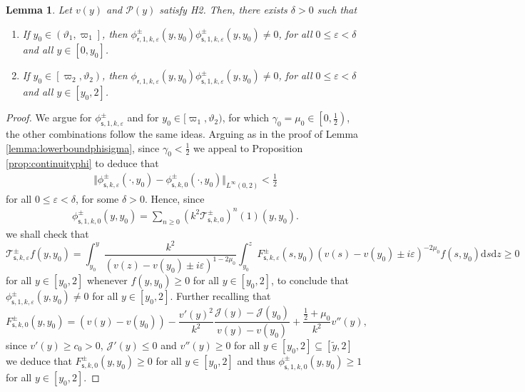 \documentclass[11pt,reqno]{amsproc}
\newtheorem{lemma}[proposition]{Lemma}
\theoremstyle{definition}
\numberwithin{equation}{section}
\newcommand{\cJ}{{\mathcal{J}}}
\newcommand{\sr}{{\mathsf{r}}}
\newcommand{\s}{{\mathsf{s}}}
\newcommand{\cT}{{\mathcal T}}
\renewcommand{\d}{\mathrm{d}}
\newcommand{\ep}{\varepsilon}
\renewcommand{\P}{{\mathcal{P}}}
\begin{document}
\begin{lemma}\label{lemma:nonzerophisrphis}
Let $v(y)$ and $\P(y)$ satisfy H2. Then, there exists $\delta>0$ such that
\begin{enumerate}
\item If $y_0\in \left( \vartheta_1, \varpi_1 \right]$, then $\phi_{\sr,1,k,\ep}^\pm(y,y_0)\phi_{\s,1,k,\ep}^\pm(y,y_0)\neq 0$, for all $0 \leq \ep < \delta$ and all $y\in [0,y_0]$.
\item If $y_0 \in \left[ \varpi_2, \vartheta_2 \right)$, then $\phi_{\sr,1,k,\ep}(y,y_0)\phi_{\s,1,k,\ep}^\pm(y,y_0)\neq 0$, for all $0 \leq \ep < \delta$ and all $y\in[y_0,2]$.
\end{enumerate}
\end{lemma}

\begin{proof}
We argue for $\phi_{\s,1,k,\ep}^\pm$ and for $y_0\in [\varpi_1, \vartheta_2)$, for which $\gamma_0= \mu_0 \in \left[ 0 , \frac12 \right)$, the other combinations follow the same ideas. Arguing as in the proof of Lemma \ref{lemma:lowerboundphisigma}, since $\gamma_0 < \frac12$ we appeal to Proposition \ref{prop:continuityphi} to deduce that
\begin{align*}
\Vert \phi_{\s,k,\ep}^\pm(\cdot,y_0) - \phi_{\s,k,0}^\pm(\cdot,y_0) \Vert_{L^\infty(0,2)} < \frac12
\end{align*}
for all $0 \leq \ep < \delta$, for some $\delta>0$. Hence, since
\begin{align*}
\phi_{\s,1,k,0}^\pm(y,y_0) = \sum_{n\geq 0} \left( k^2 \cT_{\s,k,0}^\pm \right)^n(1)(y,y_0).
\end{align*} 
we shall check that
\begin{equation*}
\cT_{\s,k,\ep}^\pm f(y,y_0) = \int_{y_0}^{y}\frac{k^2}{(v(z) - v(y_0) \pm i\ep)^{1-2\mu_0}}\int_{y_0}^z F_{\s,k,\ep}^\pm(s,y_0)(v(s) - v(y_0) \pm i\ep)^{-2\mu_0}f(s,y_0)\d s \d z \geq 0
\end{equation*}
for all $y\in [y_0,2]$ whenever $f(y,y_0)\geq 0$ for all $y\in [y_0,2]$, to conclude that $\phi_{\s,1,k,\ep}^\pm(y,y_0)\neq 0$ for all $y\in[y_0,2]$. Further recalling that
\begin{equation*}
F_{\s,k,0}^\pm(y,y_0) = (v(y)-v(y_0)) - \frac{v'(y)^2}{k^2} \frac{\cJ(y)-\cJ(y_0)}{v(y)-v(y_0)} + \frac{\frac12 + \mu_0}{k^2}v''(y),
\end{equation*}
since $v'(y) \geq c_0 > 0$, $\cJ'(y) \leq 0$ and $v''(y)\geq 0$ for all $y\in [y_0,2]\subseteq [\tilde y,2]$ we deduce that $F_{\s,k,0}^\pm(y,y_0)\geq 0$ for all $y\in [y_0,2]$ and thus $\phi_{\s,1,k,0}^\pm(y,y_0)\geq 1$ for all $y\in [y_0,2]$.
\end{proof}
\end{document}
